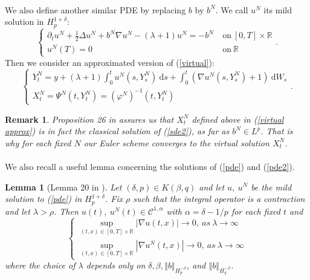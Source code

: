 \documentclass[12pt]{article}
\newtheorem{lem}[theo]{Lemma}
\newtheorem{rem}{Remark}
\newcommand{\norme}[1]{\left\Vert #1\right\Vert}
\newcommand{\R}{\mathbb{R}}
\newcommand{\di}{\mathrm{d}}
\begin{document}
        \paragraph{}
        We also define another similar PDE by replacing $b$ by $b^N$. We call $u^N$ its mild solution in $H_p^{1+\delta}$:
        \begin{equation}\label{pde2}
        \begin{cases}
        \partial_t u^N + \frac{1}{2}\Delta u^N + b^N\nabla u^N - (\lambda+1)u^N = -b^N\ &\mathrm{on}\ [0,T]\times\R\\
        u^N(T) = 0\ &\mathrm{on}\ \R
        \end{cases}.
        \end{equation}
        Then we consider an approximated version of (\ref{virtual}): \begin{equation}\label{virtual approx}
        \begin{cases}
        Y_t^N = y + (\lambda+1)\int_0^t u^N\left(s,Y_s^N\right)\ \di s +\int_0^t \left(\nabla u^N\left(s,Y_s^N\right)+1\right)\ \di W_s\\
        X_t^N = \Psi^N(t,Y_t^N) = {(\varphi^N)}^{-1}(t,Y_t^N)
        \end{cases}.
        \end{equation}
        
        \begin{rem}
            Proposition 26 in \cite{Fla-Iss-Rus-2017} assures us that $X^N_t$ defined above in (\ref{virtual approx}) is in fact the classical solution of (\ref{sde2}), as far as $b^N\in L^p$. That is why for each fixed $N$ our Euler scheme converges to the virtual solution $X^N_t$.
        \end{rem}
    
    \paragraph{}              
    We also recall a useful lemma concerning the solutions of (\ref{pde}) and (\ref{pde2}).
    
    \begin{lem}[Lemma 20 in \cite{Fla-Iss-Rus-2017}]\label{lem}
        Let $(\delta,p)\in K(\beta,q)$ and let $u,\ u^N$ be the mild solution to (\ref{pde}) in $H_p^{1+\delta}$. Fix $\rho$ such that the integral operator is a contraction and let $\lambda>\rho$. Then $u(t),\ u^N(t)\in\mathcal{C}^{1,\alpha}$ with $\alpha=\delta-1/p$ for each fixed $t$ and 
        \begin{equation*}
        \begin{cases}
        \underset{(t,x)\in[0,T]\times\R}{\sup} |\nabla u(t,x)| \rightarrow 0,\ as\ \lambda \rightarrow \infty \\
        \underset{(t,x)\in[0,T]\times\R}{\sup} |\nabla u^N(t,x)| \rightarrow 0,\ as\ \lambda \rightarrow \infty
        \end{cases}
        \end{equation*}
        where the choice of $\lambda$ depends only on $\delta,\beta,\norme{b}_{H_p^{-\beta}}$, and $\norme{b}_{H_q^{-\beta}}$.
    \end{lem}
    
\end{document}
